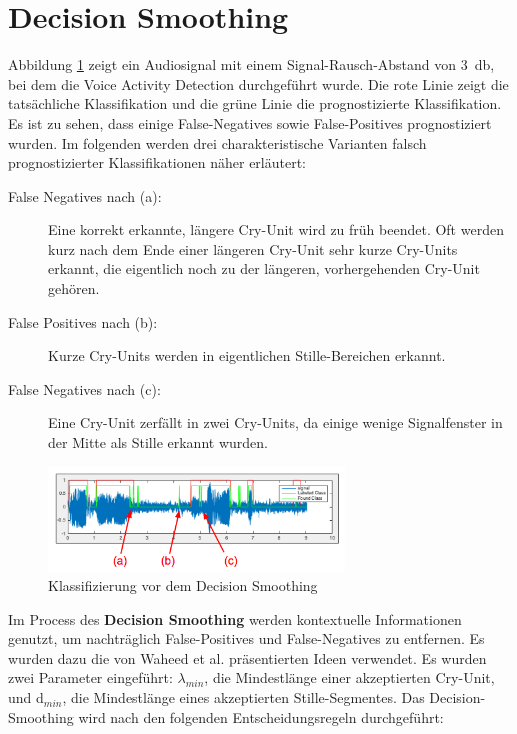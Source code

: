 \section{Decision Smoothing}
\label{sec:decision_smoothing_new}

Abbildung \ref{img:beforeSmoothing} zeigt ein Audiosignal mit einem Signal-Rausch-Abstand von \SI{3}{\decibel}, bei dem die Voice Activity Detection durchgeführt wurde. Die rote Linie zeigt die tatsächliche Klassifikation und die grüne Linie die prognostizierte Klassifikation. Es ist zu sehen, dass einige False-Negatives sowie False-Positives prognostiziert wurden. Im folgenden werden drei charakteristische Varianten falsch prognostizierter Klassifikationen näher erläutert:

\begin{description}
	\item [False Negatives nach (a): ] Eine korrekt erkannte, längere Cry-Unit wird zu früh beendet. Oft werden kurz nach dem Ende einer längeren Cry-Unit sehr kurze Cry-Units erkannt, die eigentlich noch zu der längeren, vorhergehenden Cry-Unit gehören.
	\item [False Positives nach (b): ] Kurze Cry-Units werden in eigentlichen Stille-Bereichen erkannt.
	\item [False Negatives nach (c): ] Eine Cry-Unit zerfällt in zwei Cry-Units, da einige wenige Signalfenster in der Mitte als Stille erkannt wurden.
\end{description}

\begin{figure}[h]
	\centering
	\includegraphics[width=0.7\textwidth]{bilder/smoothing02.png}
	\caption{Klassifizierung vor dem Decision Smoothing}
	\label{img:beforeSmoothing}
\end{figure}

Im Process des \textbf{Decision Smoothing} werden kontextuelle Informationen genutzt, um nachträglich False-Positives und False-Negatives zu entfernen. Es wurden dazu die von Waheed et al. \cite{vad_entropy} präsentierten Ideen verwendet. Es wurden zwei Parameter eingeführt: $\lambda_{min}$, die Mindestlänge einer akzeptierten Cry-Unit, und d$_{min}$, die Mindestlänge eines akzeptierten Stille-Segmentes. Das Decision-Smoothing wird nach den folgenden Entscheidungsregeln durchgeführt:

